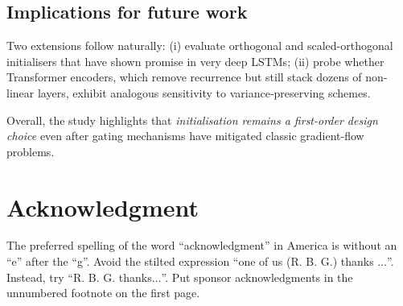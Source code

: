 \documentclass[conference]{IEEEtran}
\begin{document}
\subsection{Implications for future work}

Two extensions follow naturally:  
(i) evaluate orthogonal and scaled-orthogonal initialisers that have shown
promise in very deep LSTMs;  
(ii) probe whether Transformer encoders, which remove recurrence but still
stack dozens of non-linear layers, exhibit analogous sensitivity to
variance‐preserving schemes.

Overall, the study highlights that \emph{initialisation remains a
first-order design choice} even after gating mechanisms have mitigated
classic gradient-flow problems.



\section*{Acknowledgment}

The preferred spelling of the word ``acknowledgment'' in America is without 
an ``e'' after the ``g''. Avoid the stilted expression ``one of us (R. B. 
G.) thanks $\ldots$''. Instead, try ``R. B. G. thanks$\ldots$''. Put sponsor 
acknowledgments in the unnumbered footnote on the first page.



 








\end{document}

